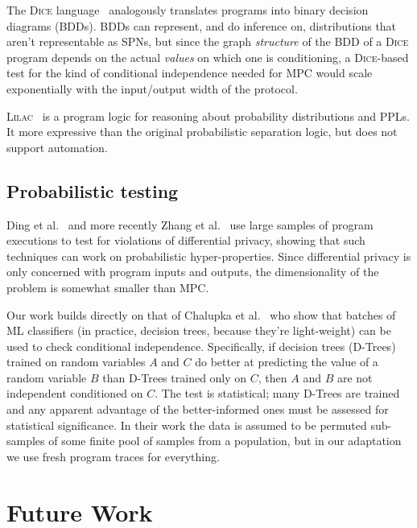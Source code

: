 \documentclass[compsoc, conference, a4paper, 10pt, times]{IEEEtran}
\begin{document}
The \textsc{Dice} language~\cite{holtzen2020scaling} analogously translates programs into binary decision diagrams (BDDs).
BDDs can represent, and do inference on, distributions that aren't representable as SPNs,
but since the graph \textit{structure} of the BDD of a \textsc{Dice} program depends on the actual \textit{values} on which one is conditioning,
a \textsc{Dice}-based test for the kind of conditional independence needed for MPC would scale exponentially with the input/output width of the protocol.

\textsc{Lilac}~\cite{li2023lilac} %
is a program logic for reasoning about probability distributions and PPLs.
It more expressive than the original probabilistic separation logic,
but does not support automation.


\subsection{Probabilistic testing}

Ding et al.~\cite{ding2018detecting} %
and more recently Zhang et al.~\cite{zhang2020testing} %
use large samples of program executions to test for violations of differential privacy,
showing that such techniques can work on probabilistic hyper-properties.
Since differential privacy is only concerned with program inputs and outputs,
the dimensionality of the problem is somewhat smaller than MPC.

Our work builds directly on that of Chalupka et al.~\cite{chalupka2018fast}
who show that batches of ML classifiers (in practice, decision trees, because they're light-weight) can be used to check conditional independence.
Specifically, if decision trees (D-Trees) trained on random variables $A$ and $C$
do better at predicting the value of a random variable $B$ than D-Trees trained only on $C$,
then $A$ and $B$ are not independent conditioned on $C$.
The test is statistical; many D-Trees are trained and any apparent advantage of the better-informed ones must be assessed for statistical significance.
In their work the data is assumed to be permuted sub-samples of some finite pool of samples from a population,
but in our adaptation we use fresh program traces for everything.

\section{Future Work}
\end{document}
